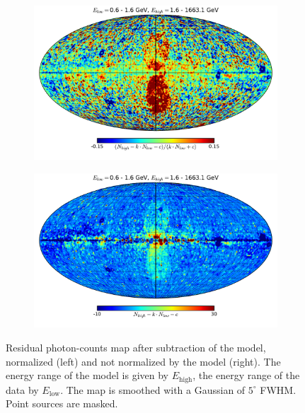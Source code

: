 \documentclass[a4paper]{article}
\begin{document}
\begin{figure}[h!]
    \begin{subfigure}{0.5\textwidth}
    	\centering
        \includegraphics[width=\textwidth]{FitE_mollweide_at_0-1_to_1-1663015.pdf}
    \end{subfigure}
    \begin{subfigure}{0.5\textwidth}
    	\centering
        \includegraphics[width=\textwidth]{FitE_mollweide_at_0-1_to_1-1663_nonorm.pdf}
    \end{subfigure} 
    \caption{Residual photon-counts map after subtraction of the model, normalized (left) and not normalized by the model (right). The energy range of the model is given by $E_{\text{high}}$, the energy range of the data by $E_{\text{low}}$. The map is smoothed with a Gaussian of $5^\circ$ FWHM. Point sources are masked.}
    \label{lowE_likelihood_mollweide}
\end{figure}\\
\end{document}
